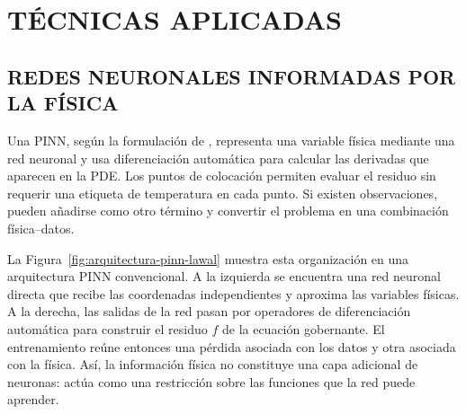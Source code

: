 \documentclass[11pt,a4paper,oneside]{report}
\begin{document}
\section{TÉCNICAS APLICADAS}
\label{sec:tecnicas-aplicadas}

\subsection{REDES NEURONALES INFORMADAS POR LA FÍSICA}
\label{subsec:pinn}

Una PINN, según la formulación de \textcite[686--690]{raissi2019}, representa una variable física mediante una red neuronal y usa diferenciación automática para calcular las derivadas que aparecen en la PDE. Los puntos de colocación permiten evaluar el residuo sin requerir una etiqueta de temperatura en cada punto. Si existen observaciones, pueden añadirse como otro término y convertir el problema en una combinación física--datos.

La Figura~\ref{fig:arquitectura-pinn-lawal} muestra esta organización en una arquitectura PINN convencional. A la izquierda se encuentra una red neuronal directa que recibe las coordenadas independientes y aproxima las variables físicas. A la derecha, las salidas de la red pasan por operadores de diferenciación automática para construir el residuo $f$ de la ecuación gobernante. El entrenamiento reúne entonces una pérdida asociada con los datos y otra asociada con la física. Así, la información física no constituye una capa adicional de neuronas: actúa como una restricción sobre las funciones que la red puede aprender.
\end{document}

